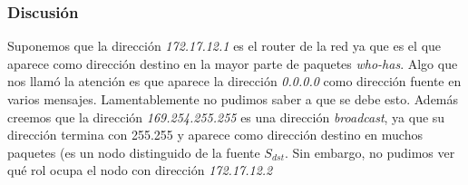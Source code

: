 \subsubsection{Discusión}

Suponemos que la dirección \emph{172.17.12.1} es el router de la red ya que es el que aparece como dirección destino en la mayor parte de paquetes \emph{who-has}. Algo que nos llamó la atención es que aparece la dirección \emph{0.0.0.0} como dirección fuente en varios mensajes. Lamentablemente no pudimos saber a que se debe esto.
Además creemos que la dirección \emph{169.254.255.255} es una dirección \emph{broadcast}, ya que su dirección termina con 255.255 y aparece como dirección destino en muchos paquetes (es un nodo distinguido de la fuente $S_{dst}$.
Sin embargo, no pudimos ver qué rol ocupa el nodo con dirección \emph{172.17.12.2}

% 
% 
% 
